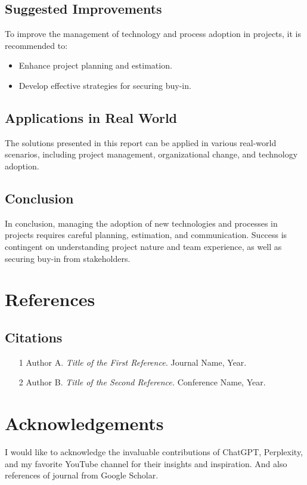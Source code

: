 \documentclass{article}
\begin{document}
\subsection{Suggested Improvements}
To improve the management of technology and process adoption in projects, it is recommended to:
\begin{itemize}
  \item Enhance project planning and estimation.
  \item Develop effective strategies for securing buy-in.
\end{itemize}
\subsection{Applications in Real World}
The solutions presented in this report can be applied in various real-world scenarios, including project management, organizational change, and technology adoption.
\subsection{Conclusion}
In conclusion, managing the adoption of new technologies and processes in projects requires careful planning, estimation, and communication. Success is contingent on understanding project nature and team experience, as well as securing buy-in from stakeholders.

\section{References}
\subsection{Citations}
\begin{itemize}
  \item [1] Author A. \textit{Title of the First Reference.} Journal Name, Year.
  \item [2] Author B. \textit{Title of the Second Reference.} Conference Name, Year.
\end{itemize}


\section{Acknowledgements}
I would like to acknowledge the invaluable contributions of ChatGPT, Perplexity, and my favorite YouTube channel for their insights and inspiration. And also references of journal from Google Scholar.
\end{document}

